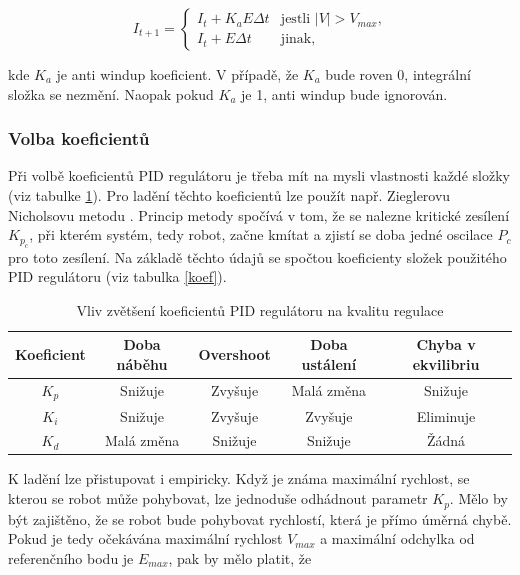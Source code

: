\documentclass[twoside]{ctuthesis}
\theoremstyle{plain}
\theoremstyle{definition}
\theoremstyle{note}
\begin{document}
\begin{equation}
I_{t+1} = \left\{
	\begin{array}{ll}
	I_t + K_aE\Delta t &\textrm{jestli $\left|V\right| > V_{max}$,}\\
	I_t + E\Delta t & \textrm{jinak,}
	\end{array}
	\right.
\end{equation}

kde $K_a$ je anti windup koeficient. V případě, že $K_a$ bude roven 0, integrální složka se nezmění. Naopak pokud $K_a$ je 1, anti windup bude ignorován.

\subsubsection{Volba koeficientů}
Při volbě koeficientů PID regulátoru je třeba mít na mysli vlastnosti každé složky (viz tabulke \ref{PID}).  Pro ladění těchto koeficientů lze použít např. Zieglerovu Nicholsovu metodu \cite{cite:21}. Princip metody spočívá v tom, že se nalezne kritické zesílení $K_{p_c}$, při kterém systém, tedy robot, začne kmítat a zjistí se doba jedné oscilace $P_c$ pro toto zesílení. Na základě těchto údajů se spočtou koeficienty složek použitého PID regulátoru (viz tabulka \ref{koef}). 

\begin{table}[hbt]
	\centering
	\caption{Vliv zvětšení koeficientů PID regulátoru na kvalitu regulace}
	\label{PID}
	\begin{tabular}{|c|c|c|c|c|}
		\hline
		\rowcolor[HTML]{C0C0C0} 
		Koeficient & Doba náběhu & Overshoot & Doba ustálení & Chyba v ekvilibriu \\ \hline
		$K_p$      & Snižuje     & Zvyšuje   & Malá změna    & Snižuje            \\ \hline
		$K_i$      & Snižuje     & Zvyšuje   & Zvyšuje       & Eliminuje          \\ \hline
		$K_d$      & Malá změna  & Snižuje   & Snižuje       & Žádná              \\ \hline
	\end{tabular}
\end{table}
K ladění lze přistupovat i empiricky. Když je známa maximální rychlost, se kterou se robot může pohybovat, lze jednoduše odhádnout parametr $K_p$. Mělo by být zajištěno, že se robot bude pohybovat rychlostí, která je přímo úměrná chybě. Pokud je tedy očekávána maximální rychlost $V_{max}$ a maximální odchylka od referenčního bodu je $E_{max}$, pak by mělo platit, že
\end{document}
